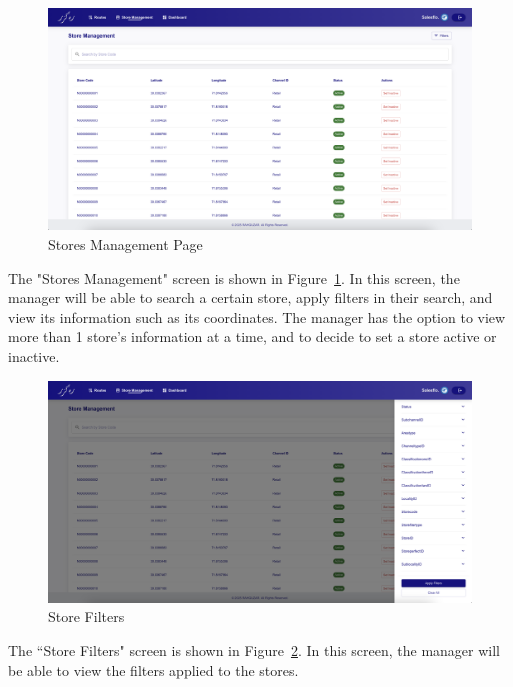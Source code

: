 \begin{figure}[H]
    \centering
    \includegraphics[width=1\textwidth]{images/stores.png} %
    \caption{Stores Management Page}
    \label{fig:image5}
\end{figure}
The "Stores Management" screen is shown in Figure~\ref{fig:image5}. In this screen, the manager will be able to search a certain store, apply filters in their search, and view its information such as its coordinates. The manager has the option to view more than 1 store's information at a time, and to decide to set a store active or inactive.

\begin{figure}[H]
    \centering
    \includegraphics[width=1\textwidth]{images/store filters.png} %
    \caption{Store Filters}
    \label{fig:image6}
\end{figure}
The ``Store Filters" screen is shown in Figure~\ref{fig:image6}. In this screen, the manager will be able to view the filters applied to the stores.


